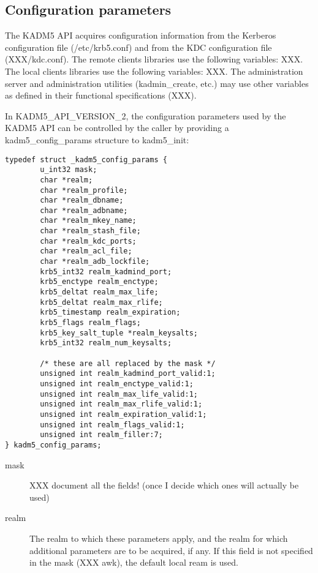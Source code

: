 \subsection{Configuration parameters}
\label{sec:configparams}

The KADM5 API acquires configuration information from the Kerberos
configuration file (/etc/krb5.conf) and from the KDC configuration
file (XXX/kdc.conf).  The remote clients libraries use the following
variables: XXX.  The local clients libraries use the following
variables: XXX.  The administration server and administration
utilities (kadmin_create, etc.) may use other variables as defined in
their functional specifications (XXX).

In KADM5_API_VERSION_2, the configuration parameters used by the KADM5
API can be controlled by the caller by providing a kadm5_config_params
structure to kadm5_init:
%
\begin{verbatim}
typedef struct _kadm5_config_params {
        u_int32 mask;
        char *realm;
        char *realm_profile;
        char *realm_dbname;
        char *realm_adbname;
        char *realm_mkey_name;
        char *realm_stash_file;
        char *realm_kdc_ports;
        char *realm_acl_file;
        char *realm_adb_lockfile;
        krb5_int32 realm_kadmind_port;
        krb5_enctype realm_enctype;
        krb5_deltat realm_max_life;
        krb5_deltat realm_max_rlife;
        krb5_timestamp realm_expiration;
        krb5_flags realm_flags;
        krb5_key_salt_tuple *realm_keysalts;
        krb5_int32 realm_num_keysalts;

        /* these are all replaced by the mask */
        unsigned int realm_kadmind_port_valid:1;
        unsigned int realm_enctype_valid:1;
        unsigned int realm_max_life_valid:1;
        unsigned int realm_max_rlife_valid:1;
        unsigned int realm_expiration_valid:1;
        unsigned int realm_flags_valid:1;
        unsigned int realm_filler:7;
} kadm5_config_params;
\end{verbatim}
%
\begin{description}
\item[mask] XXX document all the fields! (once I decide which ones
will actually be used)

\item[realm] The realm to which these parameters apply, and the realm
for which additional parameters are to be acquired, if any.  If this
field is not specified in the mask (XXX awk), the default local ream
is used.
\end{description}

